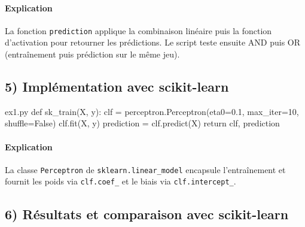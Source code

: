 \documentclass[12pt,a4paper]{article}
\begin{document}
\paragraph{Explication}
La fonction \texttt{prediction} applique la combinaison linéaire puis
la fonction d'activation pour retourner les prédictions.
Le script teste ensuite AND puis OR (entraînement puis prédiction sur le même jeu).


\subsection*{5) Implémentation avec scikit-learn}

\begin{codeholder}{ex1.py}
def sk_train(X, y):
    clf = perceptron.Perceptron(eta0=0.1, max_iter=10, shuffle=False)
    clf.fit(X, y)
    prediction = clf.predict(X)
    return clf, prediction
\end{codeholder}

\paragraph{Explication}
La classe \texttt{Perceptron} de \texttt{sklearn.linear\_model} encapsule
l'entraînement et fournit les poids via \texttt{clf.coef\_}
et le biais via \texttt{clf.intercept\_}.


\subsection*{6) Résultats et comparaison avec scikit-learn}
\end{document}
